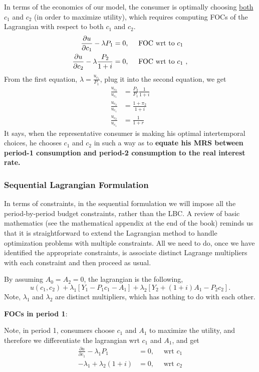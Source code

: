\documentclass[10pt]{article}
\begin{document}
In terms of the economics of our model, the consumer is optimally choosing {\underline {both}}
$ c_1 $ and $ c_2 $ (in order to maximize utility), which requires computing FOCs of the 
Lagrangian with respect to both $ c_1 $ and $ c_2 $.
\begin{align*}
\frac{\partial u }{\partial c_1 } - \lambda P_1 &= 0, \quad \text{ FOC wrt to $ c_1 $ }\\
\frac{\partial u }{\partial c_2 } - \lambda \frac{P_2}{1 + i} &= 0, \quad \text{ FOC wrt to $ c_1 $ },
\end{align*}
From the first equation, $ \lambda = \frac{u_{c_1}}{P_1} $, plug it into the second equation, we
get
\begin{align}
\frac{u_{c_2}}{u_{c_1}}&= \frac{P_2}{P_1} \frac{1}{1 + i}\\
\frac{u_{c_2}}{u_{c_1}}&= \frac{1 + \pi_2}{1 + i}\\
\frac{u_{c_2}}{u_{c_1}}&= \frac{1}{1 + r}
\end{align}
It says, when the representative consumer is making his optimal intertemporal choices, he chooses
$ c_1 $ and $ c_2 $ in such a way as to {\textbf {equate his MRS between period-1 consumption
and period-2 consumption to the real interest rate.}}


\subsubsection{Sequential Lagrangian Formulation}

In terms of constraints, in the sequential formulation we will impose all the period-by-period budget constraints, rather  than the LBC.
A review of basic mathematics (see the mathematical appendix at the end of the book) reminds us that it is straightforward to extend the Lagrangian method to handle optimization problems with multiple constraints. All we need to do, once we have identified the appropriate constraints, is associate distinct Lagrange multipliers with each constraint and then proceed as usual.

By assuming $ A_0 = A_2 = 0 $, the lagrangian is the following,
\begin{equation}
		u(c_1,c_2) + \lambda_1[Y_1 - P_1c_1 - A_1] + \lambda_2[Y_2 + (1 + i)A_1 - P_2c_2].
\end{equation}
Note, $ \lambda_1 $ and $ \lambda_2 $ are distinct multipliers, which has nothing to do with each 
other.

{\textbf {FOCs in period 1}}:

Note, in period 1, consumers choose $ c_1 $ and $ A_1 $ to maximize the utility, and therefore
we differentiate the lagrangian wrt $ c_1 $ and $ A_1 $, and get
\begin{align*}
\frac{\partial u }{\partial c_1 } - \lambda_1P_1 &= 0, \quad \text{ wrt } c_1\\
 - \lambda_1 + \lambda_2(1 + i)&= 0, \quad \text{ wrt }c_2
\end{align*}
\end{document}
